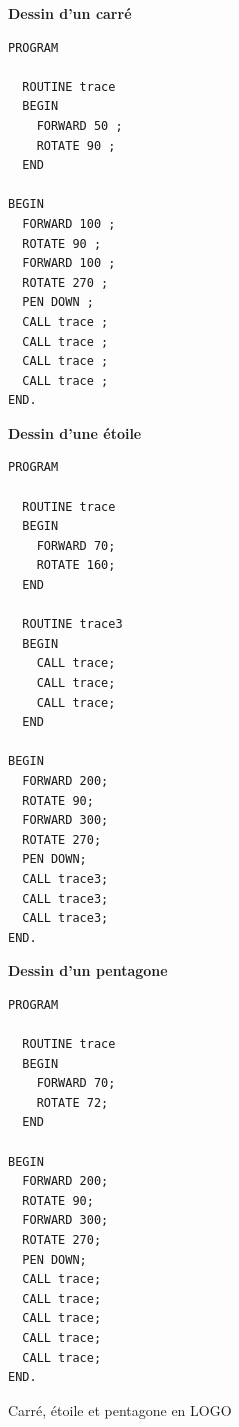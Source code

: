 \begin{table}[t]
  \centering
  \small

\begin{multicols}{3}

\textbf{Dessin d'un carré}
\begin{lstlisting}
PROGRAM

  ROUTINE trace
  BEGIN
    FORWARD 50 ;
    ROTATE 90 ;
  END

BEGIN
  FORWARD 100 ;
  ROTATE 90 ;
  FORWARD 100 ;
  ROTATE 270 ;
  PEN DOWN ;
  CALL trace ;
  CALL trace ;
  CALL trace ;
  CALL trace ;
END.
\end{lstlisting}

\columnbreak

\textbf{Dessin d'une étoile}
\begin{lstlisting}
PROGRAM

  ROUTINE trace
  BEGIN
    FORWARD 70;
    ROTATE 160;
  END

  ROUTINE trace3
  BEGIN
    CALL trace;
    CALL trace;
    CALL trace;
  END

BEGIN
  FORWARD 200;
  ROTATE 90;
  FORWARD 300;
  ROTATE 270;
  PEN DOWN;
  CALL trace3;
  CALL trace3;
  CALL trace3;
END.
\end{lstlisting}

\columnbreak

\textbf{Dessin d'un pentagone}
\begin{lstlisting}
PROGRAM

  ROUTINE trace
  BEGIN
    FORWARD 70;
    ROTATE 72;
  END

BEGIN
  FORWARD 200;
  ROTATE 90;
  FORWARD 300;
  ROTATE 270;
  PEN DOWN;
  CALL trace;
  CALL trace;
  CALL trace;
  CALL trace;
  CALL trace;
END.
\end{lstlisting}

\end{multicols}

  \caption{Carré, étoile et pentagone en LOGO}
  \ligne
\end{table}


